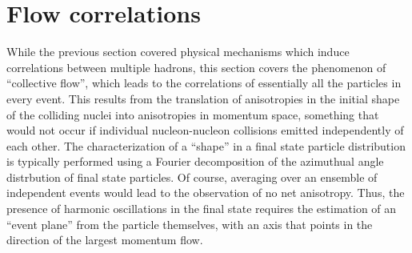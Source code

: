 \section{Flow correlations}
\label{sec:ps:flow}

While the previous section covered physical mechanisms which induce
correlations between multiple hadrons, this section covers the
phenomenon of ``collective flow'', which leads to the correlations of
essentially all the particles in every event.
This results from the translation of anisotropies in the initial shape of the
colliding nuclei into anisotropies in momentum space, something that
would not occur if individual nucleon-nucleon collisions emitted independently
of each other.
The characterization of a ``shape'' in a final state particle distribution
is typically performed using a Fourier decomposition of the azimuthual
angle distrbution of final state particles.
Of course, averaging over an ensemble of independent events would lead to
the observation of no net anisotropy.  Thus, the presence of harmonic
oscillations in the final state requires the estimation of an ``event plane''
from the particle themselves, with an axis that points in the direction of
the largest momentum flow.

